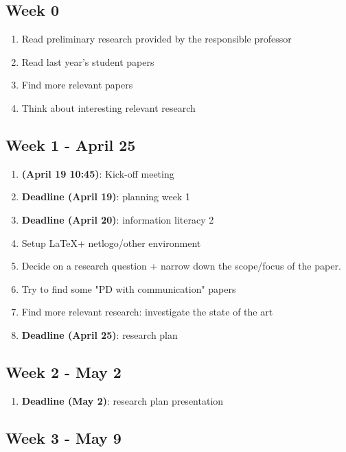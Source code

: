 \documentclass[english]{article}
\begin{document}
\subsection*{Week 0}

\begin{enumerate}
\item Read preliminary research provided by the responsible professor
\item Read last year's student papers
\item Find more relevant papers
\item Think about interesting relevant research
\end{enumerate}

\subsection*{Week 1 - April 25}
\begin{enumerate}
\item \textbf{(April 19 10:45)}: Kick-off meeting
\item \textbf{Deadline (April 19)}: planning week 1
\item \textbf{Deadline (April 20)}: information literacy 2
\item Setup \LaTeX + netlogo/other  environment
\item Decide on a research question + narrow down the scope/focus of the paper.
\item Try to find some "PD with communication" papers
\item Find more relevant research: investigate the state of the art
\item \textbf{Deadline (April 25)}: research plan
\end{enumerate}

\subsection*{Week 2 - May 2}
\begin{enumerate}
\item \textbf{Deadline (May 2)}: research plan presentation
\end{enumerate}

\subsection*{Week 3 - May 9}
\end{document}
